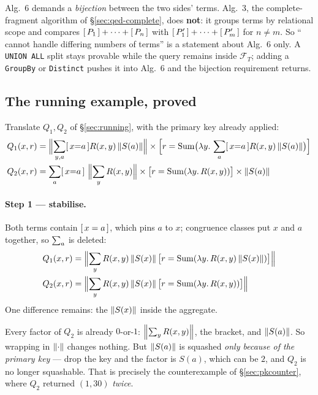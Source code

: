 \begin{remark}
Alg.~6 demands a \emph{bijection} between the two sides' terms. Alg.~3, the
complete-fragment algorithm of \S\ref{sec:qed-complete}, does \textbf{not}: it groups terms
by relational scope and compares $[\,P_1\,]+\cdots+[\,P_n\,]$ with
$[\,P'_1\,]+\cdots+[\,P'_m\,]$ for $n\neq m$. So ``\QED{} cannot handle differing numbers of
terms'' is a statement about Alg.~6 only. A \lstinline|UNION ALL| split stays provable while
the query remains inside $\mathcal F_T$; adding a \texttt{GroupBy} or \texttt{Distinct}
pushes it into Alg.~6 and the bijection requirement returns.
\end{remark}

\subsection{The running example, proved}
\label{sec:qed-worked}

Translate $Q_1,Q_2$ of \S\ref{sec:running}, with the primary key already applied:
\begin{align*}
Q_1(x,r) &= \Bigl\lVert\usum{y,a}\ind{x{=}a}R(x,y)\sq{S(a)}\Bigr\rVert
 \times\Bigl[r=\Sumagg\bigl(\lam{y}{\usum{a}\ind{x{=}a}R(x,y)\sq{S(a)}}\bigr)\Bigr]\\
Q_2(x,r) &= \usum{a}\ind{x{=}a}\ \Bigl\lVert\usum{y}R(x,y)\Bigr\rVert
 \times\bigl[r=\Sumagg(\lam{y}{R(x,y)})\bigr]\times\sq{S(a)}
\end{align*}

\paragraph{Step 1 --- stabilise.} Both terms contain $[\,x=a\,]$, which pins $a$ to $x$;
congruence classes put $x$ and $a$ together, so $\sum_{a}$ is deleted:
\begin{align*}
Q_1(x,r) &= \Bigl\lVert\sum_{y}R(x,y)\left\lVert S(x) \right\rVert\bigl[r=\mathrm{Sum}(\lambda y.\,R(x,y)\left\lVert S(x) \right\rVert)\bigr]\Bigr\rVert\\
Q_2(x,r) &= \Bigl\lVert\sum_{y}R(x,y)\left\lVert S(x) \right\rVert\bigl[r=\mathrm{Sum}(\lambda y.\,R(x,y))\bigr]\Bigr\rVert
\end{align*}
One difference remains: the $\left\lVert S(x) \right\rVert$ inside the aggregate.

\begin{remark}
Every factor of $Q_2$ is already $0$-or-$1$: $\left\lVert \sum_{y}R(x,y) \right\rVert$, the bracket, and
$\left\lVert S(a) \right\rVert$. So wrapping in $\left\lVert \cdot \right\rVert$ changes nothing. But $\left\lVert S(a) \right\rVert$ is squashed
\emph{only because of the primary key} --- drop the key and the factor is $S(a)$, which can
be $2$, and $Q_2$ is no longer squashable. That is precisely the counterexample of
\S\ref{sec:pkcounter}, where $Q_2$ returned $(1,30)$ \emph{twice}.
\end{remark}

